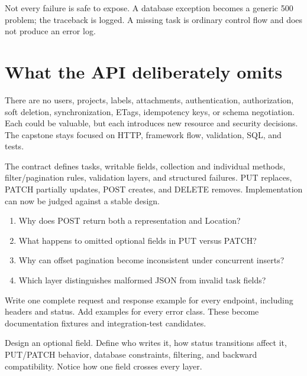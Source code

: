 Not every failure is safe to expose. A database exception becomes a generic 500
problem; the traceback is logged. A missing task is ordinary control flow and
does not produce an error log.

\section{What the API deliberately omits}

There are no users, projects, labels, attachments, authentication, authorization,
soft deletion, synchronization, ETags, idempotency keys, or schema negotiation.
Each could be valuable, but each introduces new resource and security decisions.
The capstone stays focused on HTTP, framework flow, validation, SQL, and tests.

\summarytitle

The contract defines tasks, writable fields, collection and individual methods,
filter/pagination rules, validation layers, and structured failures. PUT replaces,
PATCH partially updates, POST creates, and DELETE removes. Implementation can now
be judged against a stable design.

\reviewtitle
\begin{enumerate}
  \item Why does POST return both a representation and Location?
  \item What happens to omitted optional fields in PUT versus PATCH?
  \item Why can offset pagination become inconsistent under concurrent inserts?
  \item Which layer distinguishes malformed JSON from invalid task fields?
\end{enumerate}

\begin{exercise}
Write one complete request and response example for every endpoint, including
headers and status. Add examples for every error class. These become documentation
fixtures and integration-test candidates.
\end{exercise}

\begin{exercise}
Design an optional  field. Define who writes it, how status
transitions affect it, PUT/PATCH behavior, database constraints, filtering, and
backward compatibility. Notice how one field crosses every layer.
\end{exercise}

